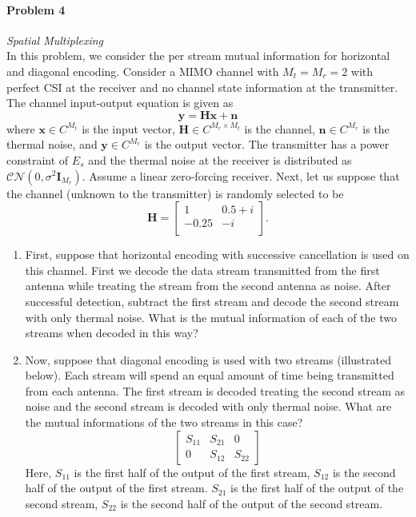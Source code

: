 \documentclass[12pt]{article}
\begin{document}
\paragraph{Problem 4}
{\it Spatial Multiplexing}\\
In this problem, we consider the per stream mutual information for horizontal and diagonal encoding.  Consider a MIMO channel with $M_t=M_r=2$ with perfect CSI at the receiver and no channel state information at the transmitter.  The channel input-output equation is given as
\begin{equation*}
\mathbf y=\mathbf H\mathbf x+\mathbf n
\end{equation*}
where $\mathbf x\in C^{M_t}$ is the input vector, $\mathbf H\in C^{M_r\times M_t}$ is the channel, $\mathbf n\in C^{M_r}$ is the thermal noise, and $\mathbf y\in C^{M_r}$ is the output vector.  The transmitter has a power constraint of $E_s$ and the thermal noise at the receiver is distributed as $\mathcal{CN}(0,\sigma^2\mathbf I_{M_r})$.  Assume a linear zero-forcing receiver. Next, let us suppose that the channel (unknown to the transmitter) is randomly selected to be
\begin{equation*}
\mathbf H=\left[ \begin{array}{cc}
1 & 0.5+i \\
-0.25 & -i\\
\end{array} \right].
\end{equation*}

\begin{enumerate}
\item  First, suppose that horizontal encoding with successive cancellation is used on this channel.  First we decode the data stream transmitted from the first antenna while treating the stream from the second antenna as noise.  After successful detection, subtract the first stream and decode the second stream with only thermal noise.  What is the mutual information of each of the two streams when decoded in this way?


\item  Now, suppose that diagonal encoding is used with two streams (illustrated below).  Each stream will spend an equal amount of time being transmitted from each antenna.  The first stream is decoded treating the second stream as noise and the second stream is decoded with only thermal noise.  What are the mutual informations of the two streams in this case?
\begin{equation*}
\left[ \begin{array}{ccc}
S_{11} & S_{21} & 0\\
0 & S_{12} & S_{22}
\end{array} \right ]
\end{equation*}
Here, $S_{11}$ is the first half of the output of the first stream, $S_{12}$ is the second half of the output of the first stream. $S_{21}$ is the first half of the output of the second stream, $S_{22}$ is the second half of the output of the second stream.
\end{enumerate}
\end{document}
